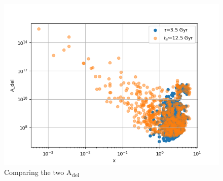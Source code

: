 \documentclass[a4paper,twocolumn]{article}
\begin{document}
\begin{figure}[!htpb]
\centering
\includegraphics[width=.9\linewidth]{./figs/Comparing_the_A_x.png}
\caption{\label{fig:Comparing the two A_{del}}Comparing the two A\textsubscript{del}}
\end{figure}
\end{document}
